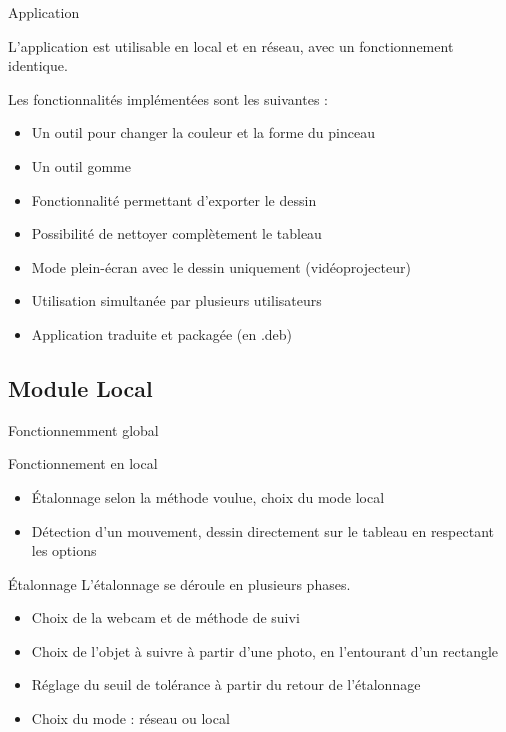 \documentclass{beamer}
\begin{document}
		\begin{frame}{Application}
			
			L'application est utilisable en local et en réseau, avec un fonctionnement identique.
			
			Les fonctionnalités implémentées sont les suivantes :
			\begin{itemize}
			\item Un outil pour changer la couleur et la forme du pinceau
			\item Un outil gomme
			\item Fonctionnalité permettant d'exporter le dessin
			\item Possibilité de nettoyer complètement le tableau
			\item Mode plein-écran avec le dessin uniquement (vidéoprojecteur)
			\item Utilisation simultanée par plusieurs utilisateurs
			\item Application traduite et packagée (en .deb)
			\end{itemize}
		\end{frame}
		
	\subsection{Module Local}
		\begin{frame}{Fonctionnemment global}
			\begin{block}{Fonctionnement en local}
				\begin{itemize}
				\item Étalonnage selon la méthode voulue, choix du mode local
				\item Détection d'un mouvement, dessin directement sur le tableau en respectant les options
				\end{itemize}
			\end{block}
		\end{frame}
		
		\begin{frame}{Étalonnage}
			L'étalonnage se déroule en plusieurs phases.
			\begin{itemize}
			\item Choix de la webcam et de méthode de suivi
			\item Choix de l'objet à suivre à partir d'une photo, en l'entourant d'un rectangle
			\item Réglage du seuil de tolérance à partir du retour de l'étalonnage
			\item Choix du mode : réseau ou local
			\end{itemize}
		\end{frame}
		
\end{document}
